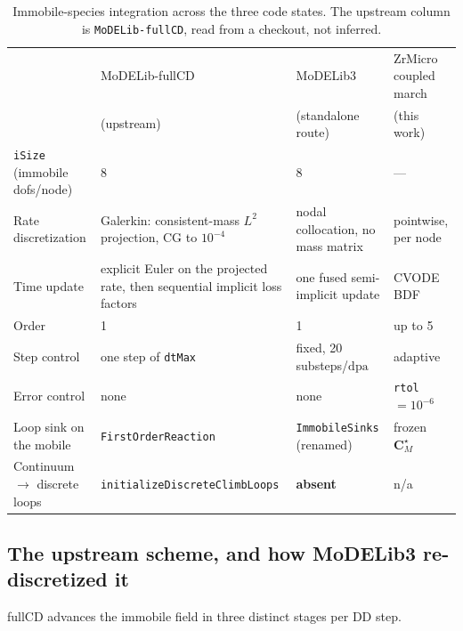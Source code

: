 \documentclass[11pt,a4paper]{article}
\newcommand{\code}[1]{\texttt{\small #1}}
\newcommand{\dpa}{\ensuremath{\mathrm{dpa}}}
\begin{document}
\begin{table}[htb]
\centering
\caption{Immobile-species integration across the three code states. The upstream
column is \code{MoDELib-fullCD}, read from a checkout, not inferred.}
\label{tab:provenance}
\begin{tabular}{lp{3.5cm}p{3.5cm}p{3.0cm}}
\toprule
& MoDELib-fullCD & MoDELib3 & ZrMicro coupled march \\
& (upstream) & (standalone route) & (this work) \\
\midrule
\code{iSize} (immobile dofs/node) & 8 & 8 & --- \\
Rate discretization & Galerkin: consistent-mass $L^2$ projection, CG to $10^{-4}$ & nodal collocation, no mass matrix & pointwise, per node \\
Time update & explicit Euler on the projected rate, then sequential implicit loss factors & one fused semi-implicit update & CVODE BDF \\
Order & 1 & 1 & up to 5 \\
Step control & one step of \code{dtMax} & fixed, 20 substeps/\dpa & adaptive \\
Error control & none & none & \code{rtol}$=10^{-6}$ \\
Loop sink on the mobile & \code{FirstOrderReaction} & \code{ImmobileSinks} (renamed) & frozen $\mathbf C_M^\star$ \\
Continuum $\to$ discrete loops & \code{initializeDiscreteClimbLoops} & \textbf{absent} & n/a \\
\bottomrule
\end{tabular}
\end{table}

\subsection{The upstream scheme, and how MoDELib3 re-discretized it}
\label{sec:fullcd}

fullCD advances the immobile field in three distinct stages per DD step.
\end{document}
